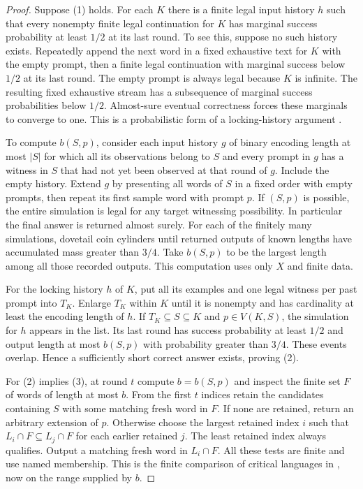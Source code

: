 \documentclass[11pt]{article}
\begin{document}
\begin{proof}
Suppose (1) holds. For each $K$ there is a finite legal input history $h$ such that every nonempty finite legal continuation for $K$ has marginal success probability at least $1/2$ at its last round. To see this, suppose no such history exists. Repeatedly append the next word in a fixed exhaustive text for $K$ with the empty prompt, then a finite legal continuation with marginal success below $1/2$ at its last round. The empty prompt is always legal because $K$ is infinite. The resulting fixed exhaustive stream has a subsequence of marginal success probabilities below $1/2$. Almost-sure eventual correctness forces these marginals to converge to one. This is a probabilistic form of a locking-history argument \cite{blum,liwitness}.

To compute $b(S,p)$, consider each input history $g$ of binary encoding length at most $|S|$ for which all its observations belong to $S$ and every prompt in $g$ has a witness in $S$ that had not yet been observed at that round of $g$. Include the empty history. Extend $g$ by presenting all words of $S$ in a fixed order with empty prompts, then repeat its first sample word with prompt $p$. If $(S,p)$ is possible, the entire simulation is legal for any target witnessing possibility. In particular the final answer is returned almost surely. For each of the finitely many simulations, dovetail coin cylinders until returned outputs of known lengths have accumulated mass greater than $3/4$. Take $b(S,p)$ to be the largest length among all those recorded outputs. This computation uses only $X$ and finite data.

For the locking history $h$ of $K$, put all its examples and one legal witness per past prompt into $T_K$. Enlarge $T_K$ within $K$ until it is nonempty and has cardinality at least the encoding length of $h$. If $T_K\subseteq S\subseteq K$ and $p\in V(K,S)$, the simulation for $h$ appears in the list. Its last round has success probability at least $1/2$ and output length at most $b(S,p)$ with probability greater than $3/4$. These events overlap. Hence a sufficiently short correct answer exists, proving (2).

For (2) implies (3), at round $t$ compute $b=b(S,p)$ and inspect the finite set $F$ of words of length at most $b$. From the first $t$ indices retain the candidates containing $S$ with some matching fresh word in $F$. If none are retained, return an arbitrary extension of $p$. Otherwise choose the largest retained index $i$ such that $L_i\cap F\subseteq L_j\cap F$ for each earlier retained $j$. The least retained index always qualifies. Output a matching fresh word in $L_i\cap F$. All these tests are finite and use named membership. This is the finite comparison of critical languages in \cite{km}, now on the range supplied by $b$.


\end{proof}
\end{document}
